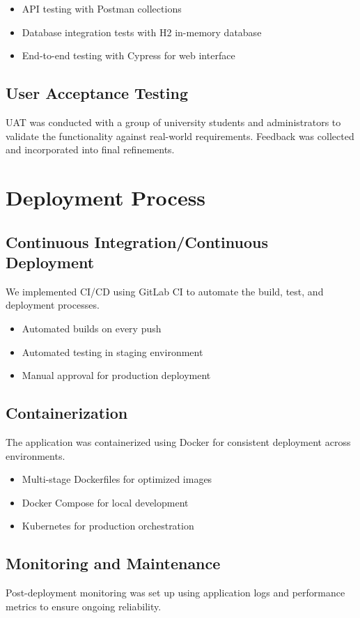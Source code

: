 \begin{sloppypar}
\begin{itemize}
\item API testing with Postman collections
\item Database integration tests with H2 in-memory database
\item End-to-end testing with Cypress for web interface
\end{itemize}

\subsection{User Acceptance Testing}
UAT was conducted with a group of university students and administrators to validate the functionality against real-world requirements. Feedback was collected and incorporated into final refinements.

\section{Deployment Process}
\vspace{-4mm}
\subsection{Continuous Integration/Continuous Deployment}
We implemented CI/CD using GitLab CI to automate the build, test, and deployment processes.

\begin{itemize}
\item Automated builds on every push
\item Automated testing in staging environment
\item Manual approval for production deployment
\end{itemize}

\subsection{Containerization}
The application was containerized using Docker for consistent deployment across environments.

\begin{itemize}
\item Multi-stage Dockerfiles for optimized images
\item Docker Compose for local development
\item Kubernetes for production orchestration
\end{itemize}

\subsection{Monitoring and Maintenance}
Post-deployment monitoring was set up using application logs and performance metrics to ensure ongoing reliability.

\end{sloppypar}
